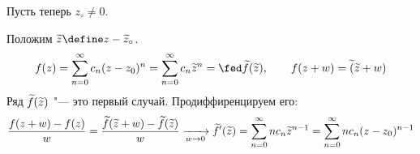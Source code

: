 \begin{iproof}
	\item Пусть теперь $ z_\circ \ne 0 $.

	Положим $ \vawe z \define z - \vawe z_\circ $.
	$$ f(z) = \sum_{n = 0}^\infty c_n(z - z_0)^n = \sum_{n = 0}^\infty c_n \vawe z^n = \fed \vawe f(\vawe z), \qquad f(z + w) = \vawe(\vawe z + w) $$
	Ряд $ \widetilde f(\widetilde z) $ "--- это первый случай. Продиффиренцируем его:
	$$ \frac{f(z + w) - f(z)}w = \frac{\widetilde f(\widetilde z + w) - \widetilde f (\widetilde z)}w \xrightarrow[w \to 0]{} \widetilde f'(\widetilde z) = \sum_{n = 0}^\infty nc_n\widetilde z^{n - 1} = \sum_{n = 0}^\infty nc_n(z - z_0)^{n - 1} $$
\end{iproof}
